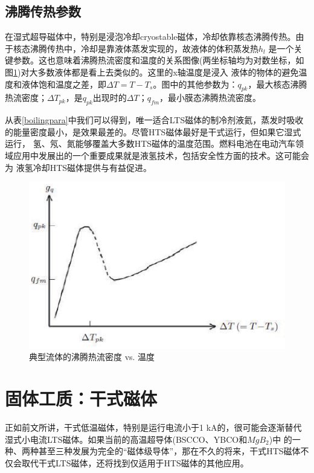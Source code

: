 \subsection*{沸腾传热参数}
在湿式超导磁体中，特别是浸泡冷却cryostable磁体，冷却依靠核态沸腾传热。由于核态沸腾传热中，冷却是靠液体蒸发实现的，故液体的体积蒸发热$h_l$
是一个关键参数。这也意味着沸腾热流密度和温度的关系图像(两坐标轴均为对数坐标，如图\ref{boilingflux})对大多数液体都是看上去类似的。这里的x轴温度是浸入
液体的物体的避免温度和液体饱和温度之差，即$\Delta T=T-T_s$。图中的其他参数为：$q_{pk}$，最大核态沸腾热流密度；$\Delta T_{pk}$，是$q_{pk}$出现时的$\Delta T$；$q_{fm}$，最小膜态沸腾热流密度。

从表\ref{boilingpara}中我们可以得到，唯一适合LTS磁体的制冷剂液氦，蒸发时吸收的能量密度最小，是效果最差的。尽管HTS磁体最好是干式运行，但如果它湿式运行，
氢、氖、氮能够覆盖大多数HTS磁体的温度范围。燃料电池在电动汽车领域应用中发展出的一个重要成果就是液氢技术，包括安全性方面的技术。这可能会为
液氢冷却HTS磁体提供与有益促进。

\begin{figure}
  \centering
 \includegraphics[scale=0.8]{chpt4/figs/fig4.1.eps}
  \caption{典型流体的沸腾热流密度 vs. 温度}\label{boilingflux}
\end{figure}

\section{固体工质：干式磁体}
正如前文所讲，干式低温磁体，特别是运行电流小于1 kA的，很可能会逐渐替代湿式小电流LTS磁体。如果当前的高温超导体(BSCCO、YBCO和$MgB_2$)中
的一种、两种甚至三种发展为完全的“磁体级导体”，那在不久的将来，干式HTS磁体不仅会取代干式LTS磁体，还将找到仅适用于HTS磁体的其他应用。

